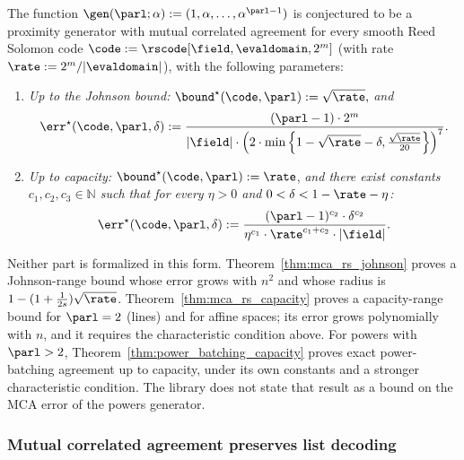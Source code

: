 \begin{remark}\label{conjecture:whir}
    The function $\gen(\parl; \alpha) := (1, \alpha, \ldots, \alpha^{\parl - 1})$ is conjectured
    to be a proximity generator with mutual correlated agreement for every smooth Reed Solomon
    code $\code := \rscode[\field, \evaldomain, 2^m]$ (with rate $\rate := 2^m /
    |\evaldomain|$), with the following parameters:
    \begin{enumerate}
        \item \textit{Up to the Johnson bound:} ${\bound}^\star(\code, \parl) := \sqrt{\rate},$ \textit{and}
        \[
        \err^\star(\code, \parl, \delta) := \frac{(\parl - 1) \cdot 2^m}{|\field| \cdot \left( 2 \cdot \min\left\{1 - \sqrt{\rate} - \delta, \frac{\sqrt{\rate}}{20} \right\} \right)^7}.
        \]

        \item \textit{Up to capacity:} ${\bound}^\star(\code, \parl) := \rate$, \textit{and there exist constants $c_1, c_2, c_3 \in \mathbb{N}$ such that for every $\eta > 0$ and $0 < \delta < 1 - \rate - \eta$:}
        \[
        \err^\star(\code, \parl, \delta) := \frac{(\parl - 1)^{c_2} \cdot \delta^{c_2}}{\eta^{c_1} \cdot \rate^{c_1 + c_2} \cdot |\field|}.
        \]
      \end{enumerate}
    Neither part is formalized in this form. Theorem~\ref{thm:mca_rs_johnson} proves a
    Johnson-range bound whose error grows with $n^2$ and whose radius is
    $1-(1+\frac{1}{2s})\sqrt{\rate}$. Theorem~\ref{thm:mca_rs_capacity} proves a capacity-range
    bound for $\parl=2$ (lines) and for affine spaces; its error grows polynomially with $n$, and
    it requires the characteristic condition above. For powers with $\parl>2$,
    Theorem~\ref{thm:power_batching_capacity} proves exact power-batching agreement up to capacity,
    under its own constants and a stronger characteristic condition. The library does not state
    that result as a bound on the MCA error of the powers generator.
\end{remark}

\subsubsection{Mutual correlated agreement preserves list decoding}


